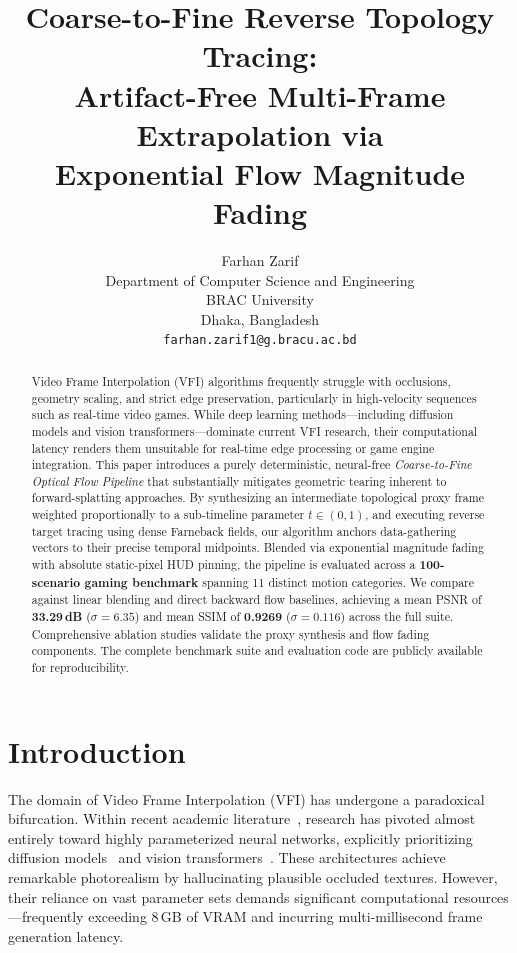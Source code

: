 \documentclass{article}
\title{Coarse-to-Fine Reverse Topology Tracing:\\ Artifact-Free Multi-Frame Extrapolation via\\ Exponential Flow Magnitude Fading}
\author{
  Farhan Zarif \\
  Department of Computer Science and Engineering\\
  BRAC University\\
  Dhaka, Bangladesh \\
  \texttt{farhan.zarif1@g.bracu.ac.bd} \\
}
\begin{document}
\maketitle

\begin{abstract}
Video Frame Interpolation (VFI) algorithms frequently struggle with occlusions, geometry scaling, and strict edge preservation, particularly in high-velocity sequences such as real-time video games. While deep learning methods---including diffusion models and vision transformers---dominate current VFI research, their computational latency renders them unsuitable for real-time edge processing or game engine integration. This paper introduces a purely deterministic, neural-free \textit{Coarse-to-Fine Optical Flow Pipeline} that substantially mitigates geometric tearing inherent to forward-splatting approaches. By synthesizing an intermediate topological proxy frame weighted proportionally to a sub-timeline parameter $t \in (0,1)$, and executing reverse target tracing using dense Farneback fields, our algorithm anchors data-gathering vectors to their precise temporal midpoints. Blended via exponential magnitude fading with absolute static-pixel HUD pinning, the pipeline is evaluated across a \textbf{100-scenario gaming benchmark} spanning 11 distinct motion categories. We compare against linear blending and direct backward flow baselines, achieving a mean PSNR of \textbf{33.29\,dB} ($\sigma = 6.35$) and mean SSIM of \textbf{0.9269} ($\sigma = 0.116$) across the full suite. Comprehensive ablation studies validate the proxy synthesis and flow fading components. The complete benchmark suite and evaluation code are publicly available for reproducibility.
\end{abstract}

\section{Introduction}

The domain of Video Frame Interpolation (VFI) has undergone a paradoxical bifurcation. Within recent academic literature~\cite{huang2022rife, li2023amt, lu2024vfimamba}, research has pivoted almost entirely toward highly parameterized neural networks, explicitly prioritizing diffusion models~\cite{danier2024ldmvfi} and vision transformers~\cite{shi2022vfiformer}. These architectures achieve remarkable photorealism by hallucinating plausible occluded textures. However, their reliance on vast parameter sets demands significant computational resources---frequently exceeding 8\,GB of VRAM and incurring multi-millisecond frame generation latency.
\end{document}
